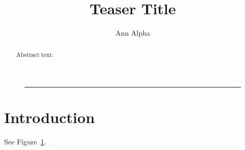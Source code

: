 \documentclass{article}
\begin{document}
\title{Teaser Title}
\author{Ann Alpha}
\maketitle
\begin{figure}[t]
  \begin{minipage}{.45\linewidth}
    \rule{2cm}{1cm}
    \label{fig:float}
  \end{minipage}
\end{figure}
\begin{abstract}
Abstract text.
\end{abstract}
\section{Introduction}
See Figure~\ref{fig:float}.
\clearpage
\end{document}
